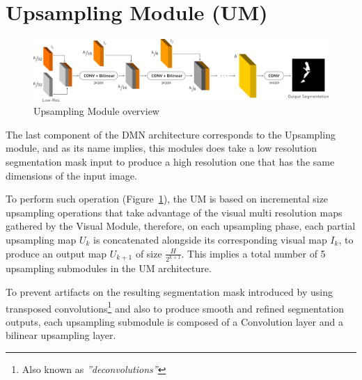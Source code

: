 \section{Upsampling Module (UM)}
\label{section:um}
\begin{figure}[!h]
\centering
\includegraphics[width=\columnwidth]{./figures/Up_Module.pdf}
\caption{Upsampling Module overview}
\label{Fig:UM}
\end{figure}
The last component of the DMN architecture corresponds to the Upsampling module, and as its name implies, this modules does take a low resolution segmentation mask input to produce a high resolution one that has the same dimensions of the input image.

To perform such operation (Figure~\ref{Fig:UM}), the UM is based on incremental size upsampling operations that take advantage of the visual multi resolution maps gathered by the Visual Module, therefore, on each upsampling phase, each partial upsampling map $U_k$ is concatenated alongside its corresponding visual map $I_k$, to produce an output map $U_{k+1}$ of size $\frac{H}{2^{k+1}}$. This implies a total number of 5 upsampling submodules in the UM architecture.

To prevent artifacts on the resulting segmentation mask introduced by using transposed convolutions\footnote{Also known as \textit{''deconvolutions''}} and also to produce smooth and refined segmentation outputs, each upsampling submodule is composed of a Convolution layer and a bilinear upsampling layer. 